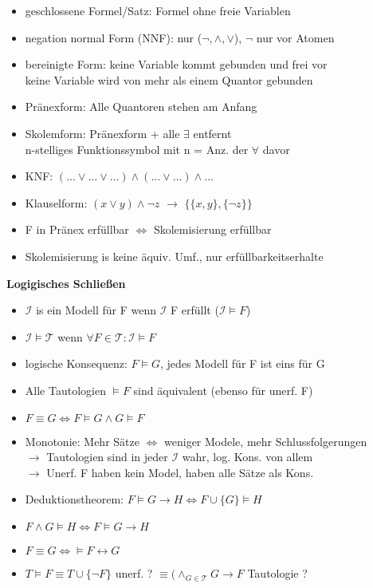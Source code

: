 \documentclass[12pt,a4paper]{article}
\begin{document}
\begin{paracol}{3}
\begin{itemize}
\setlength\itemsep{-0.5em}
\item geschlossene Formel/Satz: Formel ohne freie Variablen
\item negation normal Form (NNF): nur ($\lnot, \land, \lor$), $\lnot$ nur vor Atomen
\item bereinigte Form: keine Variable kommt gebunden und frei vor\\keine Variable wird von mehr als einem Quantor gebunden
\item Pränexform: Alle Quantoren stehen am Anfang
\item Skolemform: Pränexform + alle $\exists$ entfernt\\n-stelliges Funktionssymbol mit n = Anz. der $\forall$ davor
\item KNF: $(...\lor ... \lor ...) \land (...\lor ...) \land ...$
\item Klauselform: $(x\lor y)\land \neg z$ $\rightarrow$ $\{\{x, y\}, \{\neg z\}\}$
\item F in Pränex erfüllbar $\Leftrightarrow$ Skolemisierung erfüllbar
\item Skolemisierung is keine äquiv. Umf., nur erfüllbarkeitserhalte
\end{itemize}
\switchcolumn[2]
\centering
\textbf{Logigisches Schließen}
\flushleft
\begin{itemize}
\setlength\itemsep{-0.5em}
\item $\mathcal{I}$ is ein Modell für F wenn $\mathcal{I}$ F erfüllt ($\mathcal{I}\models F$)
\item $\mathcal{I}\models\mathcal{T}$ wenn $\forall F \in \mathcal{T}: \mathcal{I}\models F$
\item logische Konsequenz: $F\models G$, jedes Modell für F ist eins für G
\item Alle Tautologien $\models F$ sind äquivalent (ebenso für unerf. F)
\item $F \equiv G \Leftrightarrow F\models G \land G \models F$
\item Monotonie: Mehr Sätze $\Leftrightarrow$ weniger Modele, mehr Schlussfolgerungen\\$\rightarrow$ Tautologien sind in jeder $\mathcal{I}$ wahr, log. Kons. von allem\\$\rightarrow$ Unerf. F haben kein Model, haben alle Sätze als Kons.
\item Deduktionstheorem: $F \models G \rightarrow H \Leftrightarrow F \cup \{G\} \models H$
\item $F \land G \models H \Leftrightarrow F \models G \rightarrow H$
\item $F\equiv G \Leftrightarrow \models F \leftrightarrow G$
\item $T \models F \equiv T \cup \{\neg F\}$ unerf. ? $\equiv (\land_{G\in\mathcal{T}} G \rightarrow F$ Tautologie ?
\end{itemize}
\end{paracol}
\end{document}
